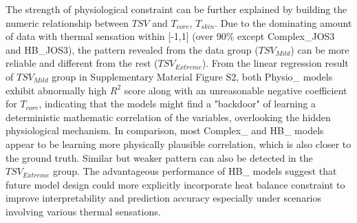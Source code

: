 The strength of physiological constraint can be further explained by building the numeric relationship between $TSV$ and $T_{core}$, $T_{skin}$. Due to the dominating amount of data with thermal sensation within [-1,1] (over 90\% except Complex\_JOS3 and HB\_JOS3), the pattern revealed from the data group ($TSV_{Mild}$) can be more reliable and different from the rest ($TSV_{Extreme}$).
From the linear regression result of $TSV_{Mild}$ group in Supplementary Material Figure S2, both Physio\_ models exhibit abnormally high $R^2$ score along with an unreasonable negative coefficient for $T_{core}$, indicating that the models might find a "backdoor" of learning a deterministic mathematic correlation of the variables, overlooking the hidden physiological mechanism. In comparison, most Complex\_ and HB\_ models appear to be learning more physically plausible correlation, which is also closer to the ground truth. Similar but weaker pattern can also be detected in the $TSV _{Extreme}$ group. The advantageous performance of HB\_ models suggest that future model design could more explicitly incorporate heat balance constraint to improve interpretability and prediction accuracy especially under scenarios involving various thermal sensations.
